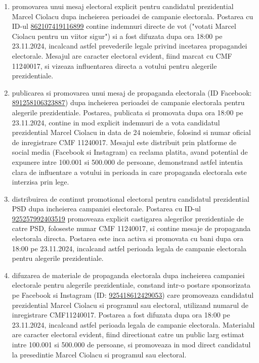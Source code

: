 \documentclass[a4paper,12pt]{article}
\begin{document}
\begin{enumerate}[leftmargin=*, label=\arabic*.)]
    \item promovarea unui mesaj electoral explicit pentru candidatul prezidential Marcel Ciolacu dupa incheierea perioadei de campanie electorala. Postarea cu ID-ul \href{https://www.facebook.com/ads/library/?id=862107419116899}{862107419116899} contine indemnuri directe de vot ("votati Marcel Ciolacu pentru un viitor sigur") si a fost difuzata dupa ora 18:00 pe 23.11.2024, incalcand astfel prevederile legale privind incetarea propagandei electorale. Mesajul are caracter electoral evident, fiind marcat cu CMF 11240017, si vizeaza influentarea directa a votului pentru alegerile prezidentiale.
    \item publicarea si promovarea unui mesaj de propaganda electorala (ID Facebook: \href{https://www.facebook.com/ads/library/?id=891258106323887}{891258106323887}) dupa incheierea perioadei de campanie electorala pentru alegerile prezidentiale. Postarea, publicata si promovata dupa ora 18:00 pe 23.11.2024, contine in mod explicit indemnuri de a vota candidatul prezidential Marcel Ciolacu in data de 24 noiembrie, folosind si numar oficial de inregistrare CMF 11240017. Mesajul este distribuit prin platforme de social media (Facebook si Instagram) ca reclama platita, avand potential de expunere intre 100.001 si 500.000 de persoane, demonstrand astfel intentia clara de influentare a votului in perioada in care propaganda electorala este interzisa prin lege.
    \item distribuirea de continut promotional electoral pentru candidatul prezidential PSD dupa incheierea campaniei electorale. Postarea cu ID-ul \href{https://www.facebook.com/ads/library/?id=925257992403519}{925257992403519} promoveaza explicit castigarea alegerilor prezidentiale de catre PSD, foloseste numar CMF 11240017, si contine mesaje de propaganda electorala directa. Postarea este inca activa si promovata cu bani dupa ora 18:00 pe 23.11.2024, incalcand astfel perioada legala de campanie electorala pentru alegerile prezidentiale.
    \item difuzarea de materiale de propaganda electorala dupa incheierea campaniei electorale pentru alegerile prezidentiale, constand intr-o postare sponsorizata pe Facebook si Instagram (ID: \href{https://www.facebook.com/ads/library/?id=925418612429053}{925418612429053}) care promoveaza candidatul prezidential Marcel Ciolacu si programul sau electoral, utilizand numarul de inregistrare CMF11240017. Postarea a fost difuzata dupa ora 18:00 pe 23.11.2024, incalcand astfel perioada legala de campanie electorala. Materialul are caracter electoral evident, fiind directionat catre un public larg estimat intre 100.001 si 500.000 de persoane, si promoveaza in mod direct candidatul la presedintie Marcel Ciolacu si programul sau electoral.

\end{enumerate}
\end{document}
